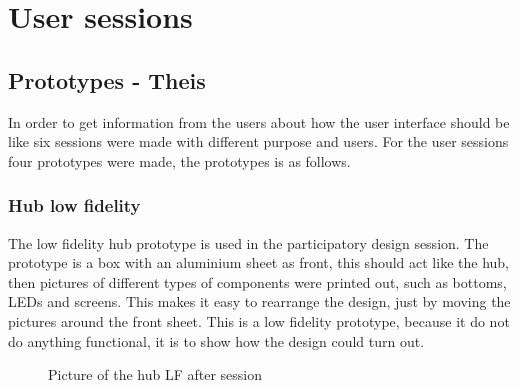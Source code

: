 \chapter{User sessions}
\section{Prototypes - Theis}
In order to get information from the users about how the user interface should be like six sessions were made with different purpose and users. For the user sessions four prototypes were made, the prototypes is as follows.

\subsection{Hub low fidelity}
The low fidelity hub prototype is used in the participatory design session. The prototype is a box with an aluminium sheet as front, this should act like the hub, then pictures of different types of components were printed out, such as bottoms, LEDs and screens. This makes it easy to rearrange the design, just by moving the pictures around the front sheet. This is a low fidelity prototype, because it do not do anything functional, it is to show how the design could turn out.
\begin{figure}[H]
	\center
		\setlength\fboxsep{0pt}
		\setlength\fboxrule{1pt}
   	\caption{Picture of the hub LF after session}
   	\label{fig:LF hub after session}
\end{figure}

